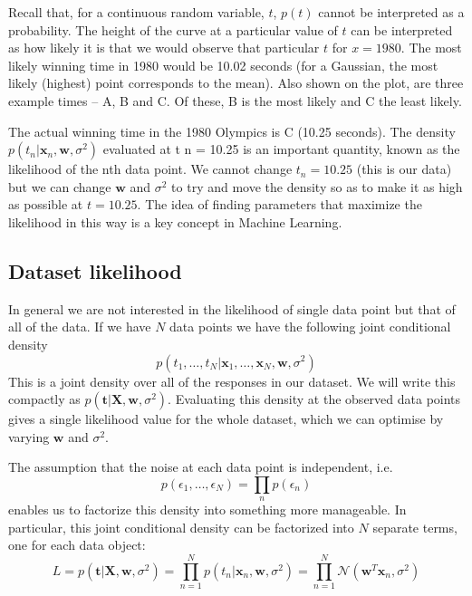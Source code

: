 \documentclass[a4paper,11pt]{article} %
\begin{document}
Recall that, for a continuous random variable, $t$, $p(t)$ cannot be
interpreted as a probability. The height of the curve at a particular value of $t$ can be
interpreted as how likely it is that we would observe that particular $t$ for $x = 1980$.
The most likely winning time in 1980 would be 10.02 seconds (for a Gaussian, the
most likely (highest) point corresponds to the mean). Also shown on the plot, are
three example times – A, B and C. Of these, B is the most likely and C the least
likely.

The actual winning time in the 1980 Olympics is C (10.25 seconds).
The density $p(t_{n} | \mathbf{x}_n , \mathbf{w}, \sigma^2)$
evaluated at t n = 10.25 is an important quantity, known as the likelihood
of the nth data point. We cannot change $t_n = 10.25$ (this is our data) but
we can change $\mathbf{w}$ and $\sigma^2$ to try and move the density so as to make
it as high as possible at $t = 10.25$. The idea of finding parameters that maximize
the likelihood in this way is a key concept in Machine Learning.

\subsection{Dataset likelihood}

In general we are not interested in the likelihood of single data point but that of
all of the data. If we have $N$ data points we have the following joint conditional
density
\begin{equation*}
p(t_{1}, \ldots, t_{N} | \mathbf{x}_{1}, \ldots, \mathbf{x}_{N}, \mathbf{w}, \sigma^2)
\end{equation*}
This is a joint density over all of the responses in our dataset.
We will write this compactly
as $p( \mathbf{t} | \mathbf{X}, \mathbf{w}, \sigma^2)$.
Evaluating this density at the observed data points gives a single
likelihood value for the whole dataset, which we can optimise by varying $\mathbf{w}$
and $\sigma^2$.

The assumption that the noise at each data point is independent, i.e.
\begin{equation*}
p(\epsilon_{1}, \ldots, \epsilon_{N}) = \prod_{n} p(\epsilon_{n})
\end{equation*}
enables us to factorize this density into something more manageable. In
particular, this joint conditional density can be factorized into $N$ separate terms,
one for each data object:
\begin{equation}
L = p(\mathbf{t} | \mathbf{X},\mathbf{w},\sigma^2)
= \prod_{n=1}^{N} p(t_{n} | \mathbf{x}_{n},\mathbf{w},\sigma^2)
= \prod_{n=1}^{N} \mathcal{N}(\mathbf{w}^{T}\mathbf{x}_{n},\sigma^2)
\end{equation}
\end{document}
